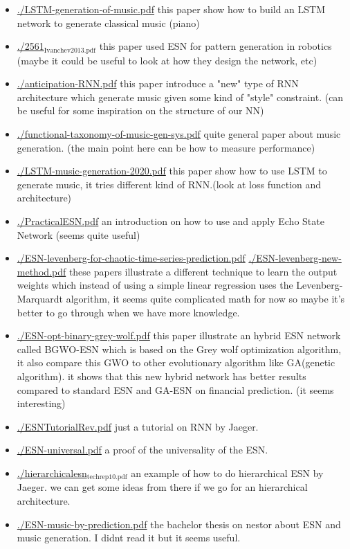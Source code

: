 \documentclass[11pt]{article}
\begin{document}
\begin{itemize}
\item \href{./LSTM-generation-of-music.pdf}{./LSTM-generation-of-music.pdf} this paper show how to build
an LSTM network to generate classical music (piano)
\item \href{./2561\_Ivanchev2013.pdf}{./2561\(_{\text{Ivanchev2013.pdf}}\)} this paper used ESN for pattern
generation in robotics (maybe it could be useful to look at how
they design the network, etc)
\item \href{./anticipation-RNN.pdf}{./anticipation-RNN.pdf} this paper introduce a "new" type of
RNN architecture which generate music given some kind of "style"
constraint. (can be useful for some inspiration on the structure
of our NN)
\item \href{./functional-taxonomy-of-music-gen-sys.pdf}{./functional-taxonomy-of-music-gen-sys.pdf} quite general paper
about music generation. (the main point here can be how to
measure performance)
\item \href{./LSTM-music-generation-2020.pdf}{./LSTM-music-generation-2020.pdf} this paper show how to use LSTM
to generate music, it tries different kind of RNN.(look at loss
function and architecture)
\item \href{./PracticalESN.pdf}{./PracticalESN.pdf} an introduction on how to use and apply
Echo State Network (seems quite useful)
\item \href{./ESN-levenberg-for-chaotic-time-series-prediction.pdf}{./ESN-levenberg-for-chaotic-time-series-prediction.pdf}
\href{./ESN-levenberg-new-method.pdf}{./ESN-levenberg-new-method.pdf} these papers illustrate a
different technique to learn the output weights which instead of
using a simple linear regression uses the Levenberg-Marquardt
algorithm, it seems quite complicated math for now so maybe it's
better to go through when we have more knowledge.
\item \href{./ESN-opt-binary-grey-wolf.pdf}{./ESN-opt-binary-grey-wolf.pdf} this paper illustrate an hybrid
ESN network called BGWO-ESN which is based on the Grey wolf
optimization algorithm, it also compare this GWO to other
evolutionary algorithm like GA(genetic algorithm). it shows that
this new hybrid network has better results compared to standard
ESN and GA-ESN on financial prediction. (it seems interesting)
\item \href{./ESNTutorialRev.pdf}{./ESNTutorialRev.pdf} just a tutorial on RNN by Jaeger.
\item \href{./ESN-universal.pdf}{./ESN-universal.pdf} a proof of the universality of the ESN.
\item \href{./hierarchicalesn\_techrep10.pdf}{./hierarchicalesn\(_{\text{techrep10.pdf}}\)} an example of how to do
hierarchical ESN by Jaeger. we can get some ideas from there if
we go for an hierarchical architecture.
\item \href{./ESN-music-by-prediction.pdf}{./ESN-music-by-prediction.pdf} the bachelor thesis on nestor
about ESN and music generation. I didnt read it but it seems useful.
\end{itemize}
\end{document}
